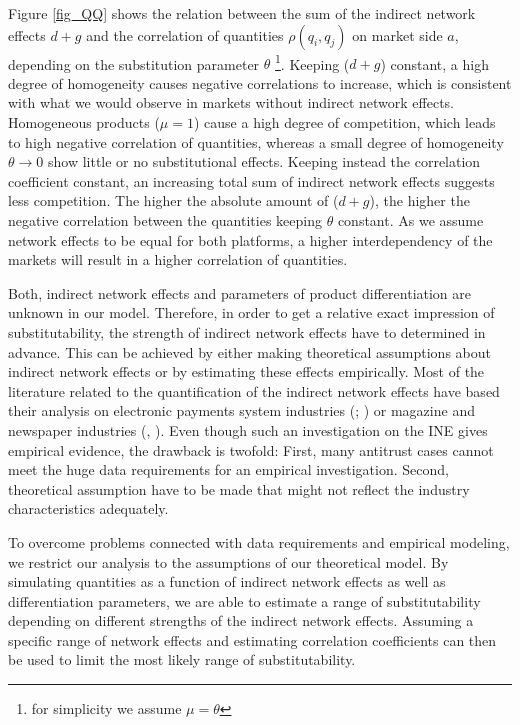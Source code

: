 \documentclass[12pt,a4paper]{scrreprt}
\begin{document}
Figure \ref{fig_QQ} shows the relation between the sum of the indirect network effects $d+g$ and the correlation of quantities $\rho(q_i,q_j)$ on market side $a$, depending on the substitution parameter $\theta$ \footnote{for simplicity we assume $\mu=\theta$}. Keeping ($d+g$) constant, a high degree of homogeneity causes negative correlations to increase, which is consistent with what we would observe in markets without indirect network effects. Homogeneous products ($\mu=1$) cause a high degree of competition, which leads to high negative correlation of quantities, whereas a small degree of homogeneity $\theta \to 0$ show little or no substitutional effects. Keeping instead the correlation coefficient constant, an increasing total sum of indirect network effects suggests less competition. The higher the absolute amount of ($d+g$), the higher the negative correlation between the quantities keeping $\theta$ constant. As we assume network effects to be equal for both platforms, a higher interdependency of the markets will result in a higher correlation of quantities. 

Both, indirect network effects and parameters of product differentiation are unknown in our model. Therefore, in order to get a relative exact impression of substitutability, the strength of indirect network effects have to determined in advance. This can be achieved by either making theoretical assumptions about indirect network effects or by estimating these effects empirically. Most of the literature related to the quantification of the indirect network effects have based their analysis on electronic payments system industries (\cite{ackerberg_quantifying_2006}; \cite{rysman_empirical_2007}) or magazine and newspaper industries (\cite{kaiser_price_2006}, \cite{argentesi_estimating_2007}). Even though such an investigation on the INE gives empirical evidence, the drawback is twofold: First, many antitrust cases cannot meet the huge data requirements for an empirical investigation. Second, theoretical assumption have to be made that might not reflect the industry characteristics adequately. 

To overcome problems connected with data requirements and empirical modeling, we restrict our analysis to the assumptions of our theoretical model. By simulating quantities as a function of indirect network effects as well as differentiation parameters, we are able to estimate a range of substitutability depending on different strengths of the indirect network effects. Assuming a specific range of network effects and estimating correlation coefficients can then be used to limit the most likely range of substitutability.  
\end{document}
